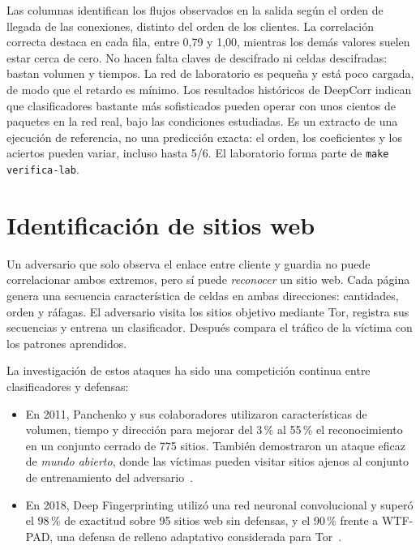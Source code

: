 Las columnas identifican los flujos observados en la salida según el orden de llegada de las conexiones, distinto del orden de los clientes. La correlación correcta destaca en cada fila, entre 0,79 y 1,00, mientras los demás valores suelen estar cerca de cero. No hacen falta claves de descifrado ni celdas descifradas: bastan volumen y tiempos. La red de laboratorio es pequeña y está poco cargada, de modo que el retardo es mínimo. Los resultados históricos de DeepCorr indican que clasificadores bastante más sofisticados pueden operar con unos cientos de paquetes en la red real, bajo las condiciones estudiadas. Es un extracto de una ejecución de referencia, no una predicción exacta: el orden, los coeficientes y los aciertos pueden variar, incluso hasta 5/6. El laboratorio forma parte de \texttt{make verifica-lab}.

\section{Identificación de sitios web}\label{sec:att-wf}

Un adversario que solo observa el enlace entre cliente y guardia no puede correlacionar ambos extremos, pero sí puede \emph{reconocer} un sitio web. Cada página genera una secuencia característica de celdas en ambas direcciones: cantidades, orden y ráfagas. El adversario visita los sitios objetivo mediante Tor, registra sus secuencias y entrena un clasificador. Después compara el tráfico de la víctima con los patrones aprendidos.

La investigación de estos ataques ha sido una competición continua entre clasificadores y defensas:
\begin{itemize}
  \item En 2011, Panchenko y sus colaboradores utilizaron características de volumen, tiempo y dirección para mejorar del 3\,\% al 55\,\% el reconocimiento en un conjunto cerrado de 775 sitios. También demostraron un ataque eficaz de \emph{mundo abierto}, donde las víctimas pueden visitar sitios ajenos al conjunto de entrenamiento del adversario~\cite{panchenko2011website}.
  \item En 2018, Deep Fingerprinting utilizó una red neuronal convolucional y superó el 98\,\% de exactitud sobre 95 sitios web sin defensas, y el 90\,\% frente a WTF-PAD, una defensa de relleno adaptativo considerada para Tor~\cite{sirinam2018deep}.
\end{itemize}

